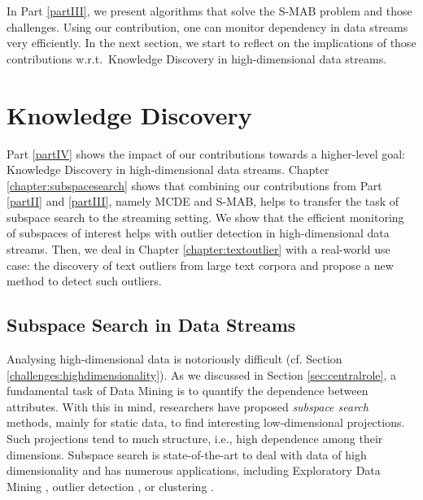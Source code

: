 In Part \ref{partIII}, we present algorithms that solve the \gls{S-MAB} problem and those challenges. Using our contribution, one can monitor dependency in data streams very efficiently. In the next section, we start to reflect on the implications of those contributions w.r.t.\ Knowledge Discovery in high-dimensional data streams. 

\section{Knowledge Discovery}

Part \ref{partIV} shows the impact of our contributions towards a higher-level goal: Knowledge Discovery in high-dimensional data streams. Chapter \ref{chapter:subspacesearch} shows that combining our contributions from Part \ref{partII} and \ref{partIII}, namely \gls{MCDE} and \gls{S-MAB}, helps to transfer the task of subspace search to the streaming setting. We show that the efficient monitoring of subspaces of interest helps with outlier detection in high-dimensional data streams. Then, we deal in Chapter  \ref{chapter:textoutlier} with a real-world use case: the discovery of text outliers from large text corpora and propose a new method to detect such outliers. 

\subsection{Subspace Search in Data Streams}
\label{prelim:subspacesearch}

Analysing high-dimensional data is notoriously difficult (cf. Section \ref{challenges:highdimensionality}). As we discussed in Section \ref{sec:centralrole}, a fundamental task of Data Mining is to quantify the dependence between attributes. %
With this in mind, researchers have proposed \textit{subspace search} methods, mainly for static data, to find interesting low-dimensional projections. Such projections tend to much structure, i.e., high dependence among their dimensions. 
Subspace search is state-of-the-art to deal with data of high dimensionality and has numerous applications, including Exploratory Data Mining \cite{DBLP:journals/sigkdd/AssentKMS07, DBLP:conf/ieeevast/TatuMFBSSK12}, outlier detection \cite{DBLP:conf/icde/ZhangGW08, DBLP:conf/icde/KellerMB12,  DBLP:journals/ijdsa/TrittenbachB19}%
, or clustering \cite{DBLP:conf/sigmod/ProcopiucJAM02, DBLP:conf/pkdd/KailingKKW03, DBLP:conf/icdm/BaumgartnerPKKK04, DBLP:conf/cikm/ParkL07, DBLP:conf/icdm/ZhangLW07}.  %

